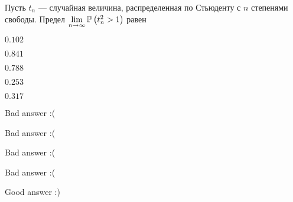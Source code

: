 
\begin{question}
Пусть \(t_n\) --- случайная величина, распределенная по Стьюденту с
\(n\) степенями свободы. Предел
\(\lim\limits_{n\to\infty}\P\left(t_{n}^2>1\right)\) равен
\begin{answerlist}
  \item \(0.102\)
  \item \(0.841\)
  \item \(0.788\)
  \item \(0.253\)
  \item \(0.317\)
\end{answerlist}
\end{question}

\begin{solution}
\begin{answerlist}
  \item Bad answer :(
  \item Bad answer :(
  \item Bad answer :(
  \item Bad answer :(
  \item Good answer :)
\end{answerlist}
\end{solution}

